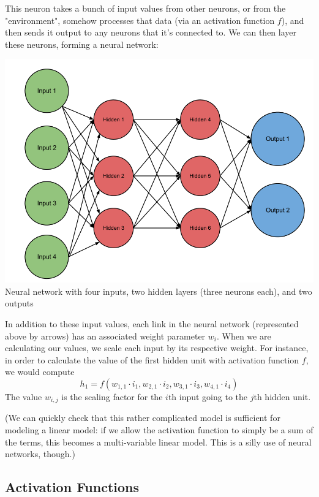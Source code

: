 \documentclass{article}
\begin{document}
This neuron takes a bunch of input values from other neurons, or from the
"environment", somehow processes that data (via an activation function $f$), and
then sends it output to any neurons that it's connected to. We can then layer
these neurons, forming a neural network:

\begin{center}
    \includegraphics[scale=0.5]{images/neural-network.png} \\
    Neural network with four inputs, two hidden layers (three neurons each), and two outputs
\end{center}

In addition to these input values, each link in the neural network (represented
above by arrows) has an associated weight parameter \(w_i\). When we are
calculating our values, we scale each input by its respective weight. For
instance, in order to calculate the value of the first hidden unit with
activation function $f$, we would compute
\[h_1 = f(w_{1,1}\cdot i_1, w_{2, 1}\cdot i_2, w_{3,1}\cdot i_3, w_{4,1}\cdot i_4)\]
The value \(w_{i, j}\) is the scaling factor for the $i$th input going to the
$j$th hidden unit.

(We can quickly check that this rather complicated model is sufficient for
modeling a linear model: if we allow the activation function to simply be a sum
of the terms, this becomes a multi-variable linear model. This is a silly use
of neural networks, though.)

\subsection*{Activation Functions}
\end{document}
